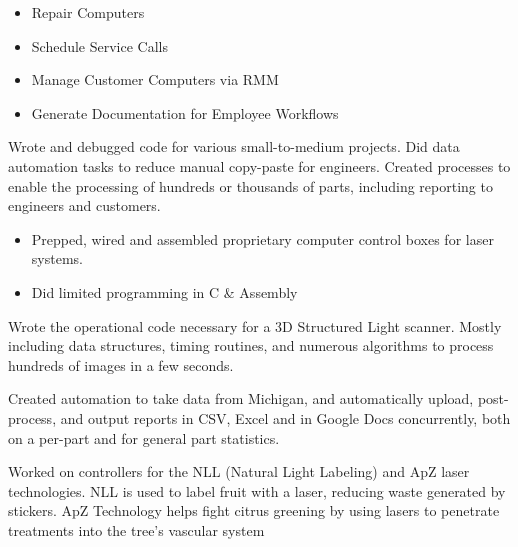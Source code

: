 \documentclass[10pt,letterpaper,ragged2e,withhyper]{altacv}
\begin{document}
\begin{paracol}{2}

\begin{itemize}
  \item Repair Computers
  \item Schedule Service Calls
  \item Manage Customer Computers via RMM
  \item Generate Documentation for Employee Workflows
\end{itemize}

Wrote and debugged code for various small-to-medium projects.
Did data automation tasks to reduce manual copy-paste for engineers.
Created processes to enable the processing of hundreds or thousands of parts,
including reporting to engineers and customers.

\begin{itemize}
\item Prepped, wired and assembled proprietary computer control boxes for laser systems.
\item Did limited programming in C \& Assembly
\end{itemize}


Wrote the operational code necessary for a 3D Structured Light scanner.
Mostly including data structures, timing routines, and numerous algorithms
to process hundreds of images in a few seconds.

Created automation to take data from Michigan,
and automatically upload, post-process, and output reports in CSV,
Excel and in Google Docs concurrently, both on a per-part and for
general part statistics.

Worked on controllers for the NLL (Natural Light Labeling) and ApZ laser technologies.
NLL is used to label fruit with a laser, reducing waste generated by stickers.
ApZ Technology helps fight citrus greening by using lasers to penetrate treatments into the tree’s vascular system


\end{paracol}
\end{document}
